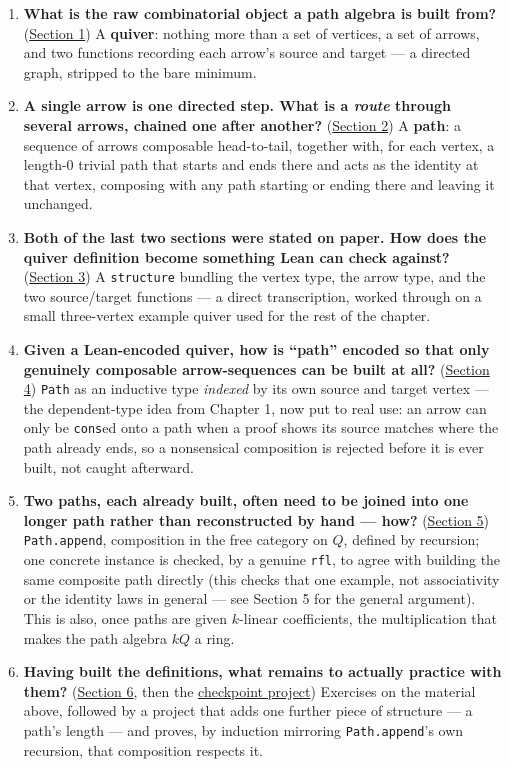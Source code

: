 \begin{enumerate}
\def\labelenumi{\arabic{enumi}.}
\tightlist
\item
  \textbf{What is the raw combinatorial object a path algebra is built from?} (\hyperref[sec:11-path-algebras:01-what-is-a-quiver:1]{Section 1}) A \textbf{quiver}: nothing more than a set of vertices, a set of arrows, and two functions recording each arrow's source and target --- a directed graph, stripped to the bare minimum.
\item
  \textbf{A single arrow is one directed step. What is a \emph{route} through several arrows, chained one after another?} (\hyperref[sec:11-path-algebras:02-paths:1]{Section 2}) A \textbf{path}: a sequence of arrows composable head-to-tail, together with, for each vertex, a length-\(0\) trivial path that starts and ends there and acts as the identity at that vertex, composing with any path starting or ending there and leaving it unchanged.
\item
  \textbf{Both of the last two sections were stated on paper. How does the quiver definition become something Lean can check against?} (\hyperref[sec:11-path-algebras:03-defining-a-quiver:1]{Section 3}) A \texttt{structure} bundling the vertex type, the arrow type, and the two source/target functions --- a direct transcription, worked through on a small three-vertex example quiver used for the rest of the chapter.
\item
  \textbf{Given a Lean-encoded quiver, how is ``path'' encoded so that only genuinely composable arrow-sequences can be built at all?} (\hyperref[sec:11-path-algebras:04-paths-as-inductive-type:1]{Section 4}) \texttt{Path} as an inductive type \emph{indexed} by its own source and target vertex --- the dependent-type idea from Chapter 1, now put to real use: an arrow can only be \texttt{cons}ed onto a path when a proof shows its source matches where the path already ends, so a nonsensical composition is rejected before it is ever built, not caught afterward.
\item
  \textbf{Two paths, each already built, often need to be joined into one longer path rather than reconstructed by hand --- how?} (\hyperref[sec:11-path-algebras:05-path-composition:1]{Section 5}) \texttt{Path.append}, composition in the free category on \(Q\), defined by recursion; one concrete instance is checked, by a genuine \texttt{rfl}, to agree with building the same composite path directly (this checks that one example, not associativity or the identity laws in general --- see Section 5 for the general argument). This is also, once paths are given \(k\)-linear coefficients, the multiplication that makes the path algebra \(kQ\) a ring.
\item
  \textbf{Having built the definitions, what remains to actually practice with them?} (\hyperref[sec:11-path-algebras:06-exercises:1]{Section 6}, then the \hyperref[sec:11-path-algebras:07-checkpoint-project:1]{checkpoint project}) Exercises on the material above, followed by a project that adds one further piece of structure --- a path's length --- and proves, by induction mirroring \texttt{Path.append}'s own recursion, that composition respects it.
\end{enumerate}

